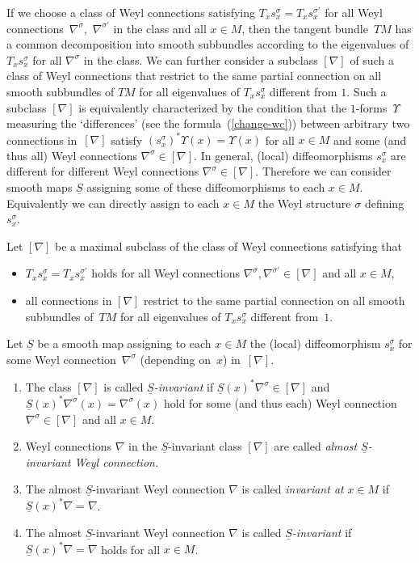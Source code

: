 \documentclass[10pt,a4paper]{amsart}
\newcommand{\si}{\sigma}
\newcommand{\un}{\underline}
\newcommand{\U}{\Upsilon}
\numberwithin{equation}{section}
\begin{document}
If we choose a class of Weyl connections satisfying $T_xs_x^\si=T_xs_x^{\si'}$ for all Weyl connec\-tions~$\nabla^\si$,~$\nabla^{\si'}$ in the class and all $x\in M$, then the tangent bundle~$TM$ has a common decomposition into smooth subbundles according to the eigenvalues of $T_xs_x^\si$ for all $\nabla^\si$ in the class. We can further consider a subclass $[\nabla]$ of such a class of Weyl connections that restrict to the same partial connection on all smooth subbundles of $TM$ for all eigenvalues of $T_xs_x^\si$ dif\/ferent from $1$. Such a subclass $[\nabla]$ is equivalently characterized by the condition that the $1$-forms~$\U$ measuring the `dif\/ferences' (see the formula~(\ref{change-wc})) between arbitrary two connections in~$[\nabla]$ satisfy $(s_x^\si)^*\U(x)=\U(x)$ for all $x\in M$ and some (and thus all) Weyl connections $\nabla^\si\in [\nabla]$. In general, (local) dif\/feomorphisms $s_x^\si$ are dif\/ferent for dif\/ferent Weyl connections $\nabla^\si\in [\nabla]$. Therefore we can consider smooth maps $\un S$ assigning some of these dif\/feomorphisms to each $x\in M$. Equivalently we can directly assign to each $x\in M$ the Weyl structure $\si$ def\/ining $s_x^\si$.

\begin{Definition} \label{almost-invariant-ws}
Let $[\nabla]$ be a maximal subclass of the class of Weyl connections satisfying that
\begin{itemize}\itemsep=0pt
\item $T_xs_x^\si=T_xs_x^{\si'}$ holds for all Weyl connections $\nabla^\si,\nabla^{\si'}\in [\nabla]$ and all $x\in M$,
\item all connections in $[\nabla]$ restrict to the same partial connection on all smooth subbundles of~$TM$ for all eigenvalues of $T_xs_x^\si$ dif\/ferent from~$1$.
\end{itemize}
Let $\un S$ be a smooth map assigning to each $x\in M$ the (local) dif\/feomorphism $s_x^\si$ for some Weyl connection~$\nabla^\si$ (depending on~$x$) in~$[\nabla]$.
\begin{enumerate}\itemsep=0pt
\item The class $[\nabla]$ is called \emph{$\un S$-invariant} if $\un S(x)^*\nabla^\si\in [\nabla]$ and $\un S(x)^*\nabla^\si(x)=\nabla^\si(x)$ hold for some (and thus each) Weyl connection $\nabla^\si\in [\nabla]$ and all $x\in M$.
\item Weyl connections $\nabla$ in the $\un S$-invariant class $[\nabla]$ are called \emph{almost $\un S$-invariant Weyl connection.}
\item The almost $\un S$-invariant Weyl connection $\nabla$ is called \emph{invariant at} $x\in M$ if $\un S(x)^*\nabla=\nabla$.
\item The almost $\un S$-invariant Weyl connection $\nabla$ is called \emph{$\un S$-invariant} if $\un S(x)^*\nabla=\nabla$ holds for all $x\in M$.
 \end{enumerate}
\end{Definition}
\end{document}
